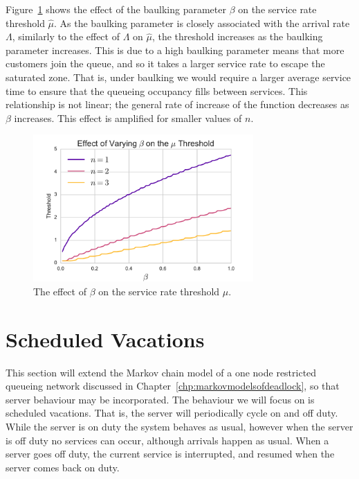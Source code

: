 \documentclass{article}
\begin{document}
Figure~\ref{fig:betathreshold} shows the effect of the baulking parameter $\beta$ on the service rate threshold $\hat{\mu}$.
As the baulking parameter is closely associated with the arrival rate $\Lambda$, similarly to the effect of $\Lambda$ on $\hat{\mu}$, the threshold increases as the baulking parameter increases.
This is due to a high baulking parameter means that more customers join the queue, and so it takes a larger service rate to escape the saturated zone.
That is, under baulking we would require a larger average service time to ensure that the queueing occupancy fills between services.
This relationship is not linear; the general rate of increase of the function decreases as $\beta$ increases.
This effect is amplified for smaller values of $n$.

\begin{figure}[!hbtp]
  \begin{center}
    \includegraphics[width=0.75\textwidth]{img/thresholdbeta_plot}
  \end{center}
  \caption{The effect of $\beta$ on the service rate threshold $\hat{\mu}$.}
  \label{fig:betathreshold}
\end{figure}



\section{Scheduled Vacations}

This section will extend the Markov chain model of a one node restricted queueing network discussed in Chapter~\ref{chp:markovmodelsofdeadlock}, so that server behaviour may be incorporated.
The behaviour we will focus on is scheduled vacations.
That is, the server will periodically cycle on and off duty.
While the server is on duty the system behaves as usual, however when the server is off duty no services can occur, although arrivals happen as usual.
When a server goes off duty, the current service is interrupted, and resumed when the server comes back on duty.
\end{document}
